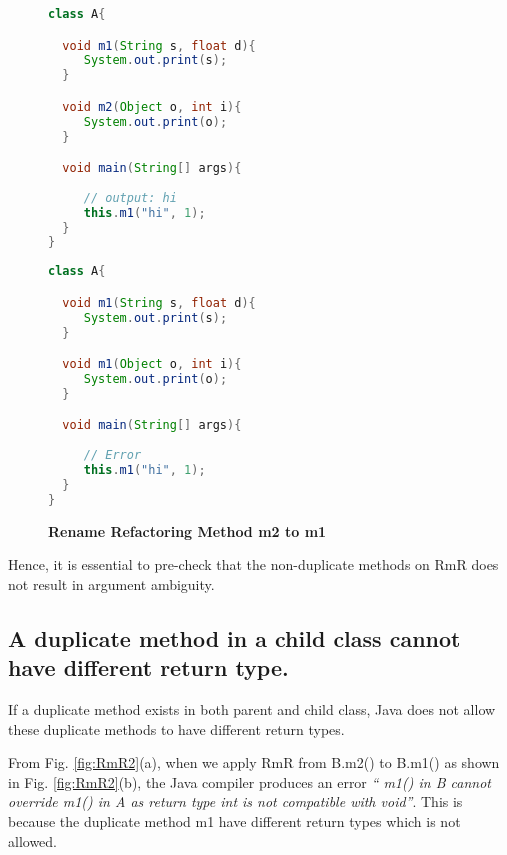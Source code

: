 \begin{figure}[th]
\centering
\begin{minipage}[t]{0.48\linewidth}
\begin{lstlisting}[language=java, basicstyle=\scriptsize\ttfamily,frame=single]
class A{

  void m1(String s, float d){
     System.out.print(s); 
  }

  void m2(Object o, int i){
     System.out.print(o);
  }

  void main(String[] args){
	
     // output: hi
     this.m1("hi", 1);
  }
}
\end{lstlisting}
\end{minipage}
\hfill
\begin{minipage}[t]{0.48\linewidth}
\begin{lstlisting}[language=java, basicstyle=\scriptsize\ttfamily,frame=single]
class A{

  void m1(String s, float d){
     System.out.print(s); 
  }

  void m1(Object o, int i){
     System.out.print(o);
  }

  void main(String[] args){
  
     // Error
     this.m1("hi", 1);
  }
}

\end{lstlisting}
\end{minipage}
\caption{\textbf{Rename Refactoring Method m2 to m1}}
\label{fig:RmR5}
\end{figure}

Hence, it is essential to pre-check that the non-duplicate methods on RmR does not result in argument ambiguity.

\subsection{A duplicate method in a child class cannot have different return type.}

If a duplicate method exists in both parent and child class, Java does not allow these duplicate methods to have different return types.

From Fig. \ref{fig:RmR2}(a), when we apply RmR from B.m2() to B.m1() as shown in Fig. \ref{fig:RmR2}(b), the Java compiler produces an error \textsl{`` m1() in B cannot override m1() in A as return type int is not compatible with void''}. This is because the duplicate method m1 have different return types which is not allowed. 

